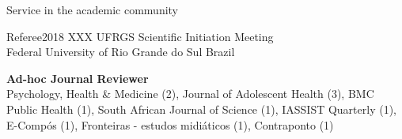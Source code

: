 \begin{rSection}{Service in the academic community}

\begin{rSubsection}
{Referee}{2018}
{XXX UFRGS Scientific Initiation Meeting}\\
{Federal University of Rio Grande do Sul} \hfill {Brazil}
\end{rSubsection}

\textbf{Ad-hoc Journal Reviewer}\\
{Psychology, Health \& Medicine} (2), {Journal of Adolescent Health} (3), {BMC Public Health} (1), {South African Journal of Science} (1), {IASSIST Quarterly} (1), {E-Compós} (1), {Fronteiras - estudos midiáticos} (1), {Contraponto} (1)

\end{rSection}
\vspace{1em}